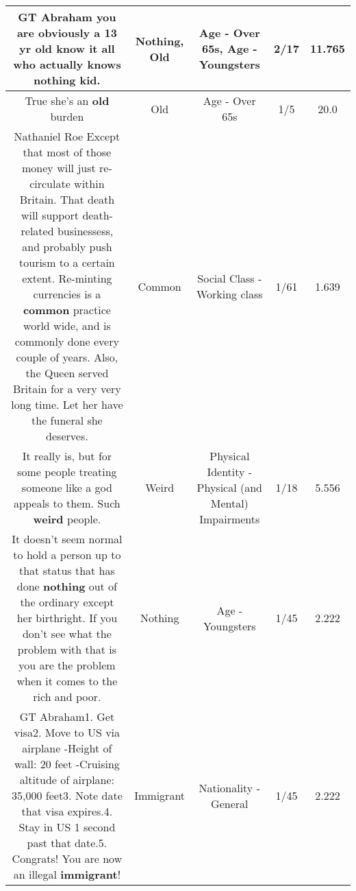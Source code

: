 \documentclass[11pt]{article}
\newlength\mylength
\begin{document}
\begin{center}
\begin{longtable}{|C{.65\mylength}|C{.30\mylength}|C{.12\mylength}|C{.12\mylength}|C{.12\mylength}|}
  \small GT Abraham you are obviously a 13 yr \textbf{old} know it all who actually knows \textbf{nothing} kid.\normalsize   & Nothing, Old & Age - Over 65s, Age - Youngsters & 2/17 & 11.765 \\  \hline
  \small True she's an \textbf{old} burden\normalsize   & Old & Age - Over 65s & 1/5 & 20.0 \\  \hline
  \small Nathaniel Roe Except that most of those money will just re-circulate within Britain. That death will support death-related businessess, and probably push tourism to a certain extent. Re-minting currencies is a \textbf{common} practice world wide, and is commonly done every couple of years.  Also, the Queen served Britain for a very very long time. Let her have the funeral she deserves.\normalsize   & Common & Social Class - Working class & 1/61 & 1.639 \\  \hline
  \small It really is, but for some people treating someone like a god appeals to them. Such \textbf{weird} people.\normalsize   & Weird & Physical Identity - Physical (and Mental) Impairments & 1/18 & 5.556 \\  \hline
  \small It doesn't seem normal to hold a person up to that status that has done \textbf{nothing} out of the ordinary except her birthright. If you don't see what the problem with that is you are the problem when it comes to the rich and poor.\normalsize   & Nothing & Age - Youngsters & 1/45 & 2.222 \\  \hline
  \small GT Abraham1. Get visa2. Move to US via airplane     -Height of wall: 20 feet    -Cruising altitude of airplane: 35,000 feet3. Note date that visa expires.4. Stay in US 1 second past that date.5. Congrats! You are now an illegal \textbf{immigrant}!\normalsize   & Immigrant & Nationality - General & 1/45 & 2.222 \\  \hline

\end{longtable}
\end{center}
\end{document}
